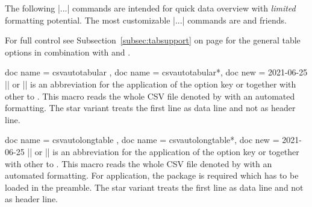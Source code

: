 \documentclass[a4paper,11pt]{ltxdoc}
\begin{document}
The following |\csvauto...| commands are intended for quick data overview
with \emph{limited} formatting potential.
The most customizable |\csvauto...| commands are
 and friends.

For full control see Subsection~\ref{subsec:tabsupport} on page \pageref{subsec:tabsupport}
for the general table options in combination with  and
.

\begin{docCommands}[
    doc parameter = \oarg{options}\marg{file name}
  ]
  {
    { doc name = csvautotabular  },
    { doc name = csvautotabular*, doc new = 2021-06-25 }
  }
  |\csvautotabular| or |\csvautotabular*|
  is an abbreviation for the application of the option key
   or 
  together with other  to .
  This macro reads the whole CSV file denoted by 
  with an automated formatting.
  The star variant treats the first line as data line and not as header line.
\begin{dispExample}
\end{dispExample}
\begin{dispExample}
\end{dispExample}
\end{docCommands}



\begin{docCommands}[
    doc parameter = \oarg{options}\marg{file name}
  ]
  {
    { doc name = csvautolongtable  },
    { doc name = csvautolongtable*, doc new = 2021-06-25 }
  }
  |\csvautolongtable| or |\csvautolongtable*|
  is an abbreviation for the application of the option key
   or 
  together with other  to .
  This macro reads the whole CSV file denoted by 
  with an automated formatting.
  For application, the package  is required which has to be
  loaded in the preamble.
  The star variant treats the first line as data line and not as header line.
\begin{dispListing}
\end{dispListing}
\end{docCommands}


\clearpage
\end{document}
